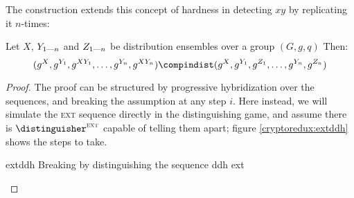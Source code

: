 The construction extends this concept of hardness in detecting $xy$ by replicating it $n$-times:
\begin{theorem}
    Let $X$, $Y_{1\text{---} n}$ and $Z_{1 \text{---} n}$ be distribution ensembles over a group $(G, g, q)$ Then:
    \[
        (g^X, g^{Y_1}, g^{XY_1}, \dots, g^{Y_n}, g^{XY_n}) \compindist (g^X, g^{Y_1}, g^{Z_1}, \dots, g^{Y_n}, g^{Z_n})
    \]
\end{theorem}

\begin{proof}

    The proof can be structured by progressive hybridization over the sequences, and breaking the \ddh{} assumption at any step $i$. Here instead, we will simulate the \textsc{ext} sequence directly in the distinguishing game, and assume there is $\distinguisher^{\textsc{ext}}$ capable of telling them apart; figure \ref{cryptoredux:extddh} shows the steps to take.

    \begin{cryptoredux}
        {extddh}
        {Breaking \ddh{} by distinguishing the \ddh{} sequence}
        {ddh}
        {ext}
        
        \cseqdelay

        \cseqbeginloop
        \cseqdelay
        \cseqdelay
        \cseqendloop
        \cseqdelay
        



    \end{cryptoredux}

\end{proof}

